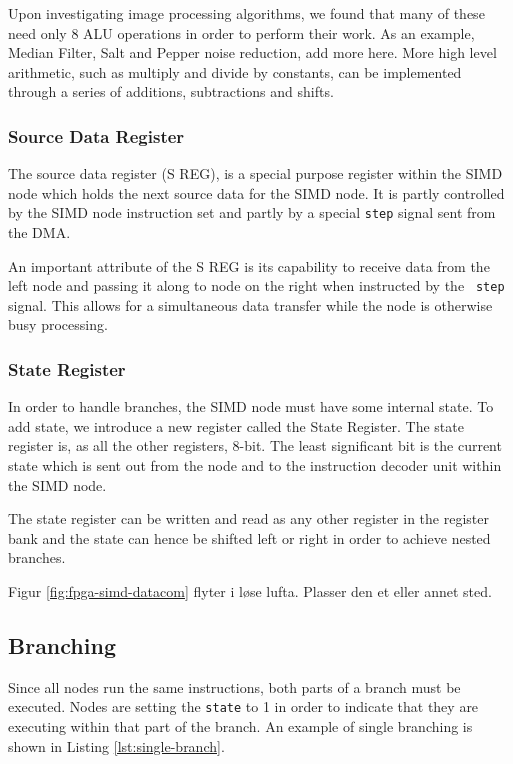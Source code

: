 
Upon investigating image processing algorithms, we found that many of these need
only 8 \ac{ALU} operations in order to perform their work. As an example, Median
Filter, Salt and Pepper noise reduction, {\color{red} add more here}. More high
level arithmetic, such as multiply and divide by constants, can be implemented
through a series of additions, subtractions and shifts. 

\subsubsection{Source Data Register}
The source data register (S REG), is a special purpose register within the
\ac{SIMD} node which holds the next source data for the \ac{SIMD} node. It is
partly controlled by the \ac{SIMD} node instruction set and partly by a special
{\tt step} signal sent from the \ac{DMA}. 

An important attribute of the S REG is its capability to receive data from the
left node and passing it along to node on the right when instructed by the {\tt
  step} signal. This allows for a simultaneous data transfer while the node is
otherwise busy processing.

\subsubsection{State Register}
In order to handle branches, the \ac{SIMD} node must have some internal
state. To add state, we introduce a new register called the State Register. The
state register is, as all the other registers, 8-bit. The least significant bit
is the current state which is sent out from the node and to the instruction
decoder unit within the \ac{SIMD} node.

The state register can be written and read as any other register in the register
bank and the state can hence be shifted left or right in order to achieve nested
branches.


{\sc \color{red} Figur \ref{fig:fpga-simd-datacom} flyter i løse lufta. Plasser
  den et eller annet sted.}

\subsection{Branching}
Since all nodes run the same instructions, both parts of a branch must be
executed. Nodes are setting the {\tt state} to 1 in order to indicate that they
are executing within that part of the branch. An example of single branching is
shown in Listing \ref{lst:single-branch}.

